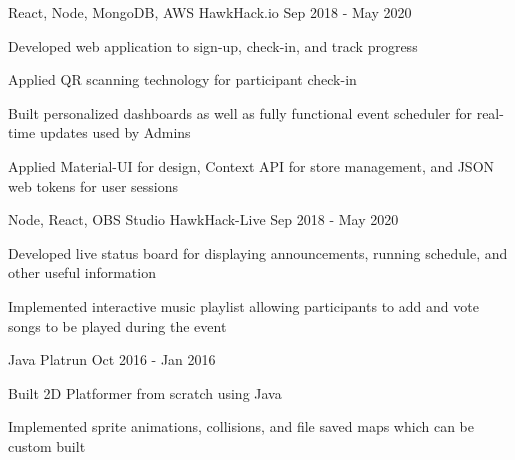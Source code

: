 

\begin{cventries}
  \cventry
    {React, Node, MongoDB, AWS} %
    {HawkHack.io} %
    {} %
    {Sep 2018 - May 2020} %
    {
      \begin{cvitems} %
        \item {Developed web application to sign-up, check-in, and track progress}
        \item{Applied QR scanning technology for participant check-in}
        \item{Built personalized dashboards as well as fully functional event scheduler for real-time updates used by Admins}
        \item{Applied Material-UI for design, Context API for store management, and JSON web tokens for user sessions}
      \end{cvitems}
    }
    \cventry
    {Node, React, OBS Studio} %
    {HawkHack-Live} %
    {} %
    {Sep 2018 - May 2020} %
    {
      \begin{cvitems} %
        \item {Developed live status board for displaying announcements, running schedule, and other useful information}
        \item{Implemented interactive music playlist allowing participants to add and vote songs to be played during the event}
      \end{cvitems}
    }
    
    \cventry
    {Java} %
    {Platrun} %
    {} %
    {Oct 2016 - Jan 2016} %
    {
      \begin{cvitems} %
        \item {Built 2D Platformer from scratch using Java}
        \item{Implemented sprite animations, collisions, and file saved maps which can be custom built}
      \end{cvitems}
    }

\end{cventries}


